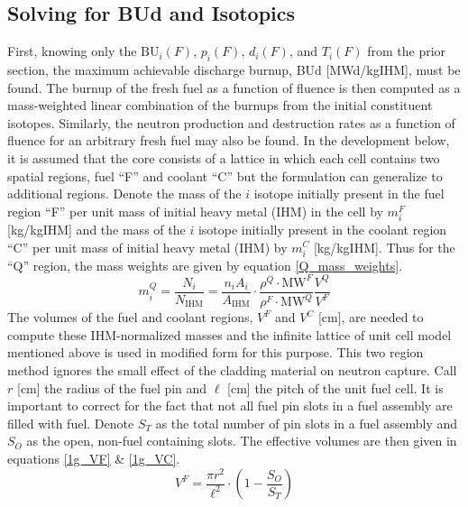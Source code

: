 \subsection{Solving for BUd and Isotopics}
\label{1g_sec:solve_BUd_iso}
First, knowing only the $\mbox{BU}_i(F)$, $p_i(F)$, $d_i(F)$, and $T_i(F)$ from the prior section, 
the maximum achievable discharge burnup, BUd [MWd/kgIHM], must be found.  The burnup of the fresh 
fuel as a function of fluence is then computed as a mass-weighted linear combination of the burnups 
from the initial constituent isotopes.  Similarly, the neutron production and destruction rates as a 
function of fluence for an arbitrary fresh fuel may also be found.  In the development below, it is 
assumed that the core consists of a lattice in which each cell contains two spatial regions, fuel ``F'' 
and coolant ``C'' but the formulation can generalize to additional regions.  Denote the mass of the 
$i$ isotope initially present in the fuel region ``F'' per unit mass of initial heavy 
metal (IHM) in the cell by $m_i^F$ [kg/kgIHM] and the mass of the $i$ 
isotope initially present in the coolant region ``C'' per unit mass of initial heavy metal (IHM) by 
$m_i^C$ [kg/kgIHM].  Thus for the ``Q'' region, the mass weights are given 
by equation \ref{Q_mass_weights}.
\begin{equation}
\label{Q_mass_weights}
m_i^Q = \frac{N_i}{N_{\mbox{IHM}}} = \frac{n_i A_i}{A_{\mbox{IHM}}} \cdot \frac{\rho^Q\cdot\mbox{MW}^F}{\rho^F\cdot\mbox{MW}^Q} \frac{V^Q}{V^F}
\end{equation}
The volumes of the fuel and coolant regions, $V^F$ and $V^C$ [cm], are needed to 
compute these IHM-normalized masses and the infinite lattice of unit cell model mentioned 
above is used in modified form for this purpose.  This two region method ignores the small 
effect of the cladding material on neutron capture.  Call $r$ [cm] the radius of the fuel pin and $\ell$ [cm] 
the pitch of the unit fuel cell.  It is important to correct for the fact that not all fuel 
pin slots in a fuel assembly are filled with fuel.  Denote $S_T$ as the total number of pin 
slots in a fuel assembly and $S_O$ as the open, non-fuel containing slots.  The effective volumes 
are then given in equations \ref{1g_VF} \& \ref{1g_VC}.
\begin{equation}
\label{1g_VF}
V^F = \frac{\pi r^2}{\ell^2} \cdot \left(1 - \frac{S_O}{S_T}\right)
\end{equation}

